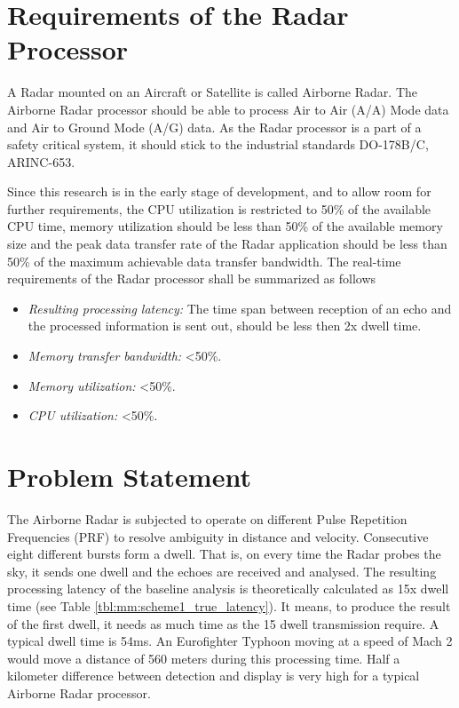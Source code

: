\section{Requirements of the Radar Processor}
\label{sec:intro:realtime_req}
A Radar mounted on an Aircraft or Satellite is called Airborne Radar. The Airborne Radar processor should be able to process Air to Air (A/A) Mode data and Air to Ground Mode (A/G) data. As the Radar processor is a part of a safety critical system, it should stick to the industrial standards DO-178B/C, ARINC-653.

Since this research is in the early stage of development, and to allow room for further requirements, the CPU utilization is restricted to 50\% of the available CPU time, memory utilization should be less than 50\% of the available memory size and the peak data transfer rate of the Radar application should be less than 50\% of the maximum achievable data transfer bandwidth. The real-time requirements of the Radar processor shall be summarized as follows
\begin{itemize}
        \itemsep0em
        \item \textit{Resulting processing latency:} The time span between reception of an echo and the processed information is sent out, should be less then 2x dwell time.
        \item \textit{Memory transfer bandwidth:} <50\%.
        \item \textit{Memory utilization:} <50\%.
        \item \textit{CPU utilization:} <50\%.
\end{itemize}


\section{Problem Statement}
\label{sec:intro:probstatement}
The Airborne Radar is subjected to operate on different Pulse Repetition Frequencies (PRF) to resolve ambiguity in distance and velocity. Consecutive eight different bursts form a dwell. That is, on every time the Radar probes the sky, it sends one dwell and the echoes are received and analysed. The resulting processing latency of the baseline analysis is theoretically calculated as 15x dwell time (see Table \ref{tbl:mm:scheme1_true_latency}).  It means, to produce the result of the first dwell, it needs as much time as the 15 dwell transmission require. A typical dwell time is 54ms. An Eurofighter Typhoon moving at a speed of Mach 2 would move a distance of 560 meters during this processing time. Half a kilometer difference between detection and display is very high for a typical Airborne Radar processor.

